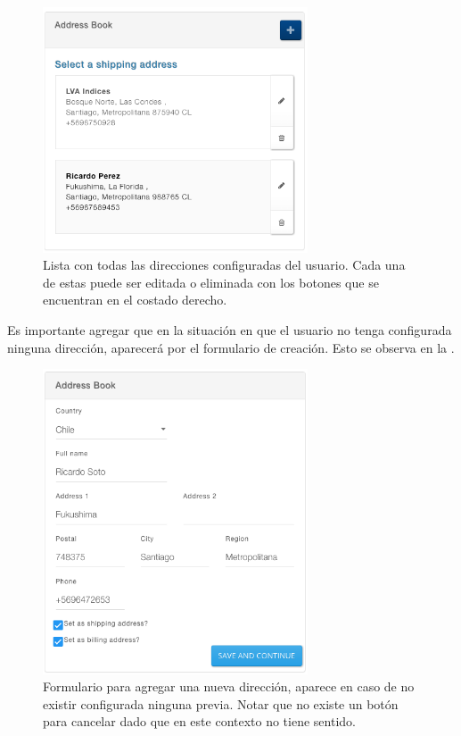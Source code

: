 		\begin{figure}[H]
			\centering
			\includegraphics[width=0.7\textwidth]{figuras/address/form/list_address.png}
			\caption{Lista con todas las direcciones configuradas del usuario. Cada una de estas puede ser editada o eliminada con los botones que se encuentran en el costado derecho.}
			\label{figure:address:form:list_address}
		\end{figure}

		Es importante agregar que en la situación en que el usuario no tenga configurada ninguna dirección, aparecerá por  el formulario de creación. Esto se observa en la .

		\begin{figure}[H]
			\centering
			\includegraphics[width=0.7\textwidth]{figuras/address/form/add_first_address.png}
			\caption{Formulario para agregar una nueva dirección, aparece en caso de no existir configurada ninguna previa. Notar que no existe un botón para cancelar dado que en este contexto no tiene sentido.}
			\label{figure:address:form:add_first_address}
		\end{figure}




